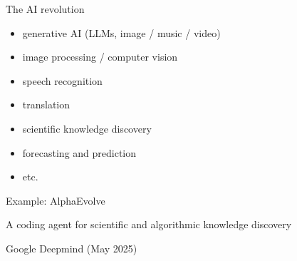 \begin{frame}{The AI revolution}


    \begin{itemize}
        \item generative AI  (LLMs, image / music / video)
        \vspace{0.5em}
        \item image processing / computer vision
        \vspace{0.5em}
        \item speech recognition
        \vspace{0.5em}
        \item translation
        \vspace{0.5em}
        \item scientific knowledge discovery
        \vspace{0.5em}
        \item forecasting and prediction 
        \vspace{0.5em}
        \item etc.
    \end{itemize}

    
\end{frame}

\begin{frame}{Example: AlphaEvolve} 

    A coding agent for scientific and algorithmic knowledge discovery

    \medskip

    \begin{figure}
       \centering
    \end{figure}

    \begin{center}
        Google Deepmind (May 2025)
    \end{center}

\end{frame}

